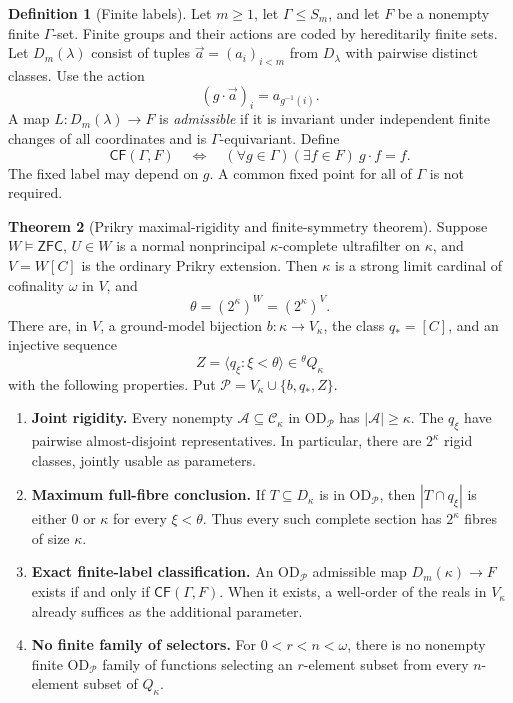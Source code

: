 \documentclass[11pt,letterpaper]{article}
\theoremstyle{definition}
\newtheorem{definition}{Definition}[section]
\newtheorem{theorem}[definition]{Theorem}
\numberwithin{equation}{section}
\newcommand{\ZFC}{\mathsf{ZFC}}
\newcommand{\OD}{\mathrm{OD}}
\newcommand{\CF}{\mathsf{CF}}
\newcommand{\Ck}{\mathcal C_\kappa}
\newcommand{\Pars}{\mathscr P}
\begin{document}
\begin{definition}[Finite labels]\label{def:finite}
Let $m\geq1$, let $\Gamma\leq S_m$, and let $F$ be a nonempty finite $\Gamma$-set. Finite groups and their actions are coded by hereditarily finite sets. Let $D_m(\lambda)$ consist of tuples $\vec a=(a_i)_{i<m}$ from $D_\lambda$ with pairwise distinct classes. Use the action
\[
 (g\cdot\vec a)_i=a_{g^{-1}(i)}.
\]
A map $L:D_m(\lambda)\to F$ is \emph{admissible} if it is invariant under independent finite changes of all coordinates and is $\Gamma$-equivariant. Define
\[
 \CF(\Gamma,F)\quad\Longleftrightarrow\quad
 (\forall g\in\Gamma)(\exists f\in F)\ g\cdot f=f.
\]
The fixed label may depend on $g$. A common fixed point for all of $\Gamma$ is not required.
\end{definition}

\begin{theorem}[Prikry maximal-rigidity and finite-symmetry theorem]\label{thm:main}
Suppose $W\models\ZFC$, $U\in W$ is a normal nonprincipal $\kappa$-complete ultrafilter on $\kappa$, and $V=W[C]$ is the ordinary Prikry extension. Then $\kappa$ is a strong limit cardinal of cofinality $\omega$ in $V$, and
\[
 \theta=(2^\kappa)^W=(2^\kappa)^V.
\]
There are, in $V$, a ground-model bijection $b:\kappa\to V_\kappa$, the class $q_*=[C]$, and an injective sequence
\[
 Z=\langle q_\xi:\xi<\theta\rangle\in{}^\theta Q_\kappa
\]
with the following properties. Put $\Pars=V_\kappa\cup\{b,q_*,Z\}$.
\begin{enumerate}[label=\textup{(\arabic*)}]
\item \textbf{Joint rigidity.} Every nonempty $\mathcal A\subseteq\Ck$ in $\OD_\Pars$ has $|\mathcal A|\geq\kappa$. The $q_\xi$ have pairwise almost-disjoint representatives. In particular, there are $2^\kappa$ rigid classes, jointly usable as parameters.
\item \textbf{Maximum full-fibre conclusion.} If $T\subseteq D_\kappa$ is in $\OD_\Pars$, then $|T\cap q_\xi|$ is either $0$ or $\kappa$ for every $\xi<\theta$. Thus every such complete section has $2^\kappa$ fibres of size $\kappa$.
\item \textbf{Exact finite-label classification.} An $\OD_\Pars$ admissible map $D_m(\kappa)\to F$ exists if and only if $\CF(\Gamma,F)$. When it exists, a well-order of the reals in $V_\kappa$ already suffices as the additional parameter.
\item \textbf{No finite family of selectors.} For $0<r<n<\omega$, there is no nonempty finite $\OD_\Pars$ family of functions selecting an $r$-element subset from every $n$-element subset of $Q_\kappa$.

\end{enumerate}
\end{theorem}
\end{document}

